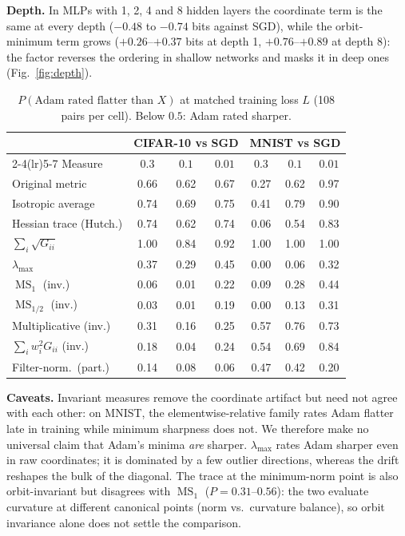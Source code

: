\documentclass[10pt,twocolumn]{article}
\theoremstyle{remark}
\newcommand{\MS}{\operatorname{MS}}
\begin{document}
\textbf{Depth.} In MLPs with 1, 2, 4 and 8 hidden layers the coordinate term is the same at every depth ($-0.48$ to $-0.74$ bits against SGD), while the orbit-minimum term grows ($+0.26$--$+0.37$ bits at depth 1, $+0.76$--$+0.89$ at depth 8): the factor reverses the ordering in shallow networks and masks it in deep ones (Fig.~\ref{fig:depth}).

\begin{table}[t]
\centering
\footnotesize
\caption{$P(\text{Adam rated flatter than }X)$ at matched training loss $L$ (108 pairs per cell). Below $0.5$: Adam rated sharper.}
\label{tab:flip}
\setlength{\tabcolsep}{2.4pt}
\begin{tabular}{lcccccc}
\toprule
& \multicolumn{3}{c}{CIFAR-10 vs SGD} & \multicolumn{3}{c}{MNIST vs SGD}\\
\cmidrule(lr){2-4}\cmidrule(lr){5-7}
Measure & $0.3$ & $0.1$ & $0.01$ & $0.3$ & $0.1$ & $0.01$\\
\midrule
Original metric & 0.66 & 0.62 & 0.67 & 0.27 & 0.62 & 0.97\\
Isotropic average & 0.74 & 0.69 & 0.75 & 0.41 & 0.79 & 0.90\\
Hessian trace (Hutch.) & 0.74 & 0.62 & 0.74 & 0.06 & 0.54 & 0.83\\
$\sum_i\sqrt{G_{ii}}$ & 1.00 & 0.84 & 0.92 & 1.00 & 1.00 & 1.00\\
$\lambda_{\max}$ & 0.37 & 0.29 & 0.45 & 0.00 & 0.06 & 0.32\\
\midrule
$\MS_1$ (inv.) & 0.06 & 0.01 & 0.22 & 0.09 & 0.28 & 0.44\\
$\MS_{1/2}$ (inv.) & 0.03 & 0.01 & 0.19 & 0.00 & 0.13 & 0.31\\
Multiplicative (inv.) & 0.31 & 0.16 & 0.25 & 0.57 & 0.76 & 0.73\\
$\sum_iw_i^2G_{ii}$ (inv.) & 0.18 & 0.04 & 0.24 & 0.54 & 0.69 & 0.84\\
Filter-norm.\ (part.) & 0.14 & 0.08 & 0.06 & 0.47 & 0.42 & 0.20\\
\bottomrule
\end{tabular}
\end{table}

\textbf{Caveats.} Invariant measures remove the coordinate artifact but need not agree with each other: on MNIST, the elementwise-relative family rates Adam flatter late in training while minimum sharpness does not. We therefore make no universal claim that Adam's minima \emph{are} sharper. $\lambda_{\max}$ rates Adam sharper even in raw coordinates; it is dominated by a few outlier directions, whereas the drift reshapes the bulk of the diagonal. The trace at the minimum-norm point is also orbit-invariant but disagrees with $\MS_1$ ($P=0.31$--$0.56$): the two evaluate curvature at different canonical points (norm vs.\ curvature balance), so orbit invariance alone does not settle the comparison.
\end{document}
